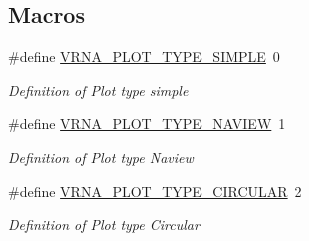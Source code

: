 \subsection*{Macros}
\begin{DoxyCompactItemize}
\item 
\#define \hyperlink{group__plotting__utils_gae6d17b9f0a53cf5205a9181e0f8422e9}{V\+R\+N\+A\+\_\+\+P\+L\+O\+T\+\_\+\+T\+Y\+P\+E\+\_\+\+S\+I\+M\+P\+LE}~0
\begin{DoxyCompactList}\small\item\em Definition of Plot type {\itshape simple} \end{DoxyCompactList}\item 
\#define \hyperlink{group__plotting__utils_ga94d4c863ecac2f220f76658afb92f964}{V\+R\+N\+A\+\_\+\+P\+L\+O\+T\+\_\+\+T\+Y\+P\+E\+\_\+\+N\+A\+V\+I\+EW}~1
\begin{DoxyCompactList}\small\item\em Definition of Plot type {\itshape Naview} \end{DoxyCompactList}\item 
\#define \hyperlink{group__plotting__utils_ga8c9eac631348da92136c8363ecdd9fb9}{V\+R\+N\+A\+\_\+\+P\+L\+O\+T\+\_\+\+T\+Y\+P\+E\+\_\+\+C\+I\+R\+C\+U\+L\+AR}~2
\begin{DoxyCompactList}\small\item\em Definition of Plot type {\itshape Circular} \end{DoxyCompactList}\end{DoxyCompactItemize}
